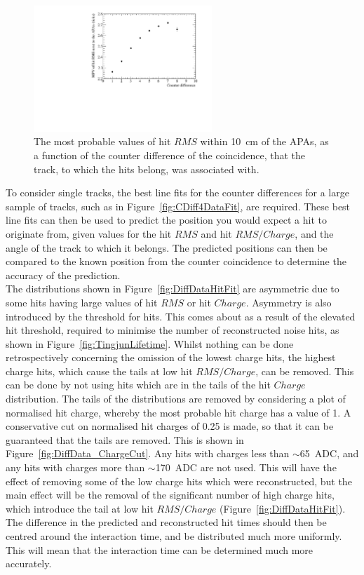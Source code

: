 \begin{figure}
  \centering
  \includegraphics[width=0.6\textwidth]{InterceptCanvasData}
  \caption[The angular dependence of diffusion in the 35 ton dataset for hits within 10~cm of the APAs]
          {The most probable values of hit $RMS$ within 10~cm of the APAs, as a function of the counter difference of the coincidence, that the track, to which the hits belong, was associated with.}
  \label{fig:DiffData_AngFit}
\end{figure}

To consider single tracks, the best line fits for the counter differences for a large sample of tracks, such as in Figure~\ref{fig:CDiff4DataFit}, are required. These best line fits can then be used to predict the position you would expect a hit to originate from, given values for the hit $RMS$ and hit $RMS/Charge$, and the angle of the track to which it belongs. The predicted positions can then be compared to the known position from the counter coincidence to determine the accuracy of the prediction. \\

The distributions shown in Figure~\ref{fig:DiffDataHitFit} are asymmetric due to some hits having large values of hit $RMS$ or hit $Charge$. Asymmetry is also introduced by the threshold for hits. This comes about as a result of the elevated hit threshold, required to minimise the number of reconstructed noise hits, as shown in Figure~\ref{fig:TingjunLifetime}. Whilst nothing can be done retrospectively concerning the omission of the lowest charge hits, the highest charge hits, which cause the tails at low hit $RMS/Charge$, can be removed. This can be done by not using hits which are in the tails of the hit $Charge$ distribution. The tails of the distributions are removed by considering a plot of normalised hit charge, whereby the most probable hit charge has a value of 1. A conservative cut on normalised hit charges of 0.25 is made, so that it can be guaranteed that the tails are removed. This is shown in Figure~\ref{fig:DiffData_ChargeCut}. Any hits with charges less than $\sim$65~ADC, and any hits with charges more than $\sim$170~ADC are not used. This will have the effect of removing some of the low charge hits which were reconstructed, but the main effect will be the removal of the significant number of high charge hits, which introduce the tail at low hit $RMS/Charge$ (Figure~\ref{fig:DiffDataHitFit}). The difference in the predicted and reconstructed hit times should then be centred around the interaction time, and be distributed much more uniformly. This will mean that the interaction time can be determined much more accurately. \\

